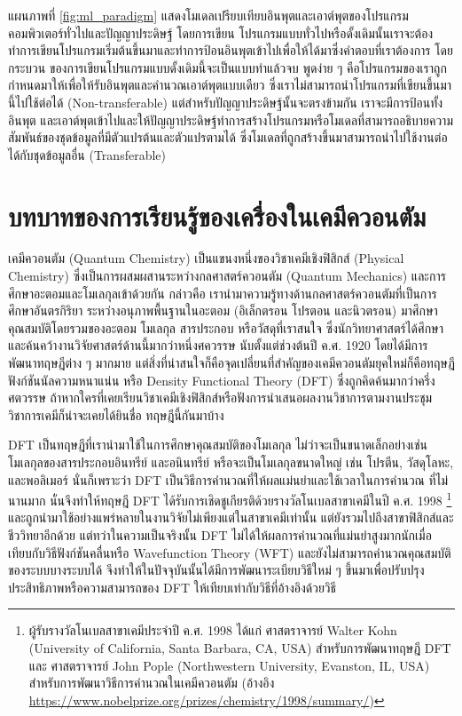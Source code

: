 แผนภาพที่ \ref{fig:ml_paradigm} แสดงโมเดลเปรียบเทียบอินพุตและเอาต์พุตของโปรแกรมคอมพิวเตอร์ทั่วไปและปัญญาประดิษฐ์ โดยการเขียน%
โปรแกรมแบบทั่วไปหรือดั้งเดิมนั้นเราจะต้องทำการเขียนโปรแกรมเริ่มต้นขึ้นมาและทำการป้อนอินพุตเข้าไปเพื่อให้ได้มาซึ่งคำตอบที่เราต้องการ โดยกระบวน%
ของการเขียนโปรแกรมแบบดั้งเดิมนี้จะเป็นแบบทำแล้วจบ พูดง่าย ๆ คือโปรแกรมของเราถูกกำหนดมาให้เพื่อให้รับอินพุตและคำนวณเอาต์พุตแบบเดียว
ซึ่งเราไม่สามารถนำโปรแกรมที่เขียนขึ้นมานี้ไปใช้ต่อได้ (Non-transferable) แต่สำหรับปัญญาประดิษฐ์นั้นจะตรงข้ามกัน เราจะมีการป้อนทั้งอินพุต%
และเอาต์พุตเข้าไปและให้ปัญญาประดิษฐ์ทำการสร้างโปรแกรมหรือโมเดลที่สามารถอธิบายความสัมพันธ์ของชุดข้อมูลที่มีตัวแปรต้นและตัวแปรตามได้ 
ซึ่งโมเดลที่ถูกสร้างขึ้นมาสามารถนำไปใช้งานต่อได้กับชุดข้อมูลอื่น (Transferable)

\section{บทบาทของการเรียนรู้ของเครื่องในเคมีควอนตัม}

เคมีควอนตัม (Quantum Chemistry) เป็นแขนงหนึ่งของวิชาเคมีเชิงฟิสิกส์ (Physical Chemistry) ซึ่งเป็นการผสมผสานระหว่างกลศาสตร์ควอนตัม 
(Quantum Mechanics) และการศึกษาอะตอมและโมเลกุลเข้าด้วยกัน กล่าวคือ เรานำมาความรู้ทางด้านกลศาสตร์ควอนตัมที่เป็นการศึกษาอันตรกิริยา%
ระหว่างอนุภาพพื้นฐานในอะตอม (อิเล็กตรอน โปรตอน และนิวตรอน) มาศึกษาคุณสมบัติโดยรวมของอะตอม โมเลกุล สารประกอบ หรือวัสดุที่เราสนใจ
ซึ่งนักวิทยาศาสตร์ได้ศึกษาและค้นคว้างานวิจัยศาสตร์ด้านนี้มากว่าหนึ่งศควรรษ นับตั้งแต่ช่วงต้นปี ค.ศ. 1920 โดยได้มีการพัฒนาทฤษฎีต่าง ๆ มากมาย 
แต่สิ่งที่น่าสนใจก็คือจุดเปลี่ยนที่สำคัญของเคมีควอนตัมยุคใหม่ก็คือทฤษฎีฟังก์ชันนัลความหนาแน่น หรือ Density Functional Theory (DFT) 
ซึ่งถูกคิดค้นมากว่าครึ่งศตวรรษ ถ้าหากใครที่เคยเรียนวิชาเคมีเชิงฟิสิกส์หรือฟังการนำเสนอผลงานวิชาการตามงานประชุมวิชาการเคมีก็น่าจะเคยได้ยินชื่อ%
ทฤษฎีนี้กันมาบ้าง 

DFT เป็นทฤษฎีที่เรานำมาใช้ในการศึกษาคุณสมบัติของโมเลกุล ไม่ว่าจะเป็นขนาดเล็กอย่างเช่นโมเลกุลของสารประกอบอินทรีย์ และอนินทรีย์ 
หรือจะเป็นโมเลกุลขนาดใหญ่ เช่น โปรตีน, วัสดุโลหะ, และพอลิเมอร์ นั่นก็เพราะว่า DFT เป็นวิธีการคำนวณที่ให้ผลแม่นยำและใช้เวลาในการคำนวณ%
ที่ไม่นานมาก นั่นจึงทำให้ทฤษฎี DFT ได้รับการเชิดชูเกียรติด้วยรางวัลโนเบลสาขาเคมีในปี ค.ศ. 1998%
\footnote{ผู้รับรางวัลโนเบลสาขาเคมีประจำปี ค.ศ. 1998 ได้แก่ ศาสตราจารย์ Walter Kohn (University of California, 
Santa Barbara, CA, USA) สำหรับการพัฒนาทฤษฎี DFT และ ศาสตราจารย์ John Pople (Northwestern University, Evanston, IL, USA) 
สำหรับการพัฒนาวิธีการคำนวณในเคมีควอนตัม (อ้างอิง \url{https://www.nobelprize.org/prizes/chemistry/1998/summary/})} 
และถูกนำมาใช้อย่างแพร่หลายในงานวิจัยไม่เพียงแต่ในสาขาเคมีเท่านั้น แต่ยังรวมไปถึงสาขาฟิสิกส์และชีววิทยาอีกด้วย แต่ทว่าในความเป็นจริงนั้น DFT 
ไม่ได้ให้ผลการคำนวณที่แม่นยำสูงมากนักเมื่อเทียบกับวิธีฟังก์ชันคลื่นหรือ Wavefunction Theory (WFT) และยังไม่สามารถคำนวณคุณสมบัติของระบบบางระบบได้ 
จึงทำให้ในปัจจุบันนั้นได้มีการพัฒนาระเบียบวิธีใหม่ ๆ ขึ้นมาเพื่อปรับปรุงประสิทธิภาพหรือความสามารถของ DFT ให้เทียบเท่ากับวิธีที่อ้างอิงด้วยวิธี

